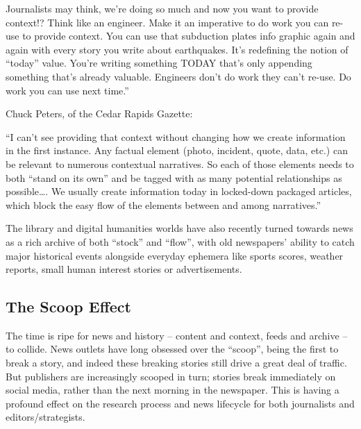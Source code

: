 Journalists may think, we’re doing so much and now you want to provide context!? Think like an engineer. Make it an imperative to do work you can re-use to provide context. You can use that subduction plates info graphic again and again with every story you write about earthquakes. It’s redefining the notion of “today” value. You’re writing something TODAY that’s only appending something that’s already valuable. Engineers don’t do work they can’t re-use. Do work you can use next time.''

Chuck Peters, of the Cedar Rapids Gazette:

``I can’t see providing that context without changing how we create information in the first instance. Any factual element (photo, incident, quote, data, etc.) can be relevant to numerous contextual narratives. So each of those elements needs to both “stand on its own” and be tagged with as many potential relationships as possible…. We usually create information today in locked-down packaged articles, which block the easy flow of the elements between and among narratives.''



The library and digital humanities worlds have also recently turned towards news as a rich archive of both ``stock'' and ``flow'', with old newspapers' ability to catch major historical events alongside everyday ephemera like sports scores, weather reports, small human interest stories or advertisements.  %

\subsection{The Scoop Effect} %

The time is ripe for news and history -- content and context, feeds and archive -- to collide. News outlets have long obsessed over the ``scoop'', being the first to break a story, and indeed these breaking stories still drive a great deal of traffic. But publishers are increasingly scooped in turn; stories break immediately on social media, rather than the next morning in the newspaper. %
This is having a profound effect on the research process and news lifecycle for both journalists and editors/strategists.

